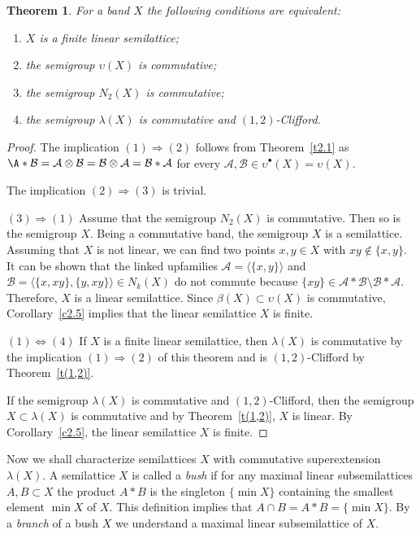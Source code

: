 \documentclass{amsart}
\newtheorem{theorem}[lem]{Theorem}
\theoremstyle{definition}
\begin{document}
\begin{theorem}\label{t2.2} For a band $X$ the following conditions are equivalent:
\begin{enumerate}
\item $X$ is a finite linear semilattice;
\item the semigroup $\upsilon(X)$ is commutative;
\item the semigroup $N_2(X)$ is commutative;
\item the semigroup $\lambda(X)$ is commutative and $(1,2)$-Clifford.
\end{enumerate}
\end{theorem}

\begin{proof} The implication $(1){\Rightarrow}(2)$ follows from Theorem~\ref{t2.1} as
$\A*\mathcal B={\mathcal A}\otimes\mathcal B=\mathcal B\otimes {\mathcal A}=\mathcal B*{\mathcal A}$ for every ${\mathcal A},\mathcal B\in{\upsilon}^\bullet(X)={\upsilon}(X)$.
\smallskip

The implication $(2){\Rightarrow}(3)$ is trivial.
\smallskip

$(3){\Rightarrow}(1)$ Assume that the semigroup $N_2(X)$ is commutative. Then so is the semigroup $X$. Being a commutative band, the semigroup $X$ is a semilattice. Assuming that $X$ is not linear, we can find two points $x,y\in X$ with $xy\notin\{x,y\}$. It can be shown that
the linked upfamilies ${\mathcal A}=\langle \{x,y\}\rangle$ and
$\mathcal B=\langle \{x,xy\}, \{y,xy\}\rangle\in N_k(X)$ do not commute because $\{xy\}\in{\mathcal A}{*}\mathcal B\setminus\mathcal B{*}{\mathcal A}$.
Therefore, $X$ is a linear semilattice. Since $\beta(X)\subset{\upsilon}(X)$ is commutative, Corollary~\ref{c2.5} implies that the linear semilattice $X$ is finite.
\smallskip

$(1)\Leftrightarrow(4)$ If $X$ is a finite linear semilattice, then $\lambda(X)$ is commutative by the  implication $(1){\Rightarrow}(2)$ of this theorem and is $(1,2)$-Clifford by Theorem~\ref{t(1,2)}.

If the semigroup $\lambda(X)$ is commutative and $(1,2)$-Clifford, then the semigroup  $X\subset\lambda(X)$ is commutative and by Theorem~\ref{t(1,2)}, $X$ is linear. By Corollary~\ref{c2.5}, the linear semilattice $X$ is finite.
\end{proof}

Now we shall characterize semilattices $X$ with commutative superextension $\lambda(X)$. A semilattice $X$ is called a {\em bush} if for any maximal linear subsemilattices $A,B\subset X$ the product $A*B$ is the singleton $\{\min X\}$ containing the smallest element $\min X$ of $X$. This definition implies that $A\cap B=A*B=\{\min X\}$. By a {\em branch} of a bush $X$ we understand a maximal linear subsemilattice of $X$.
\end{document}

